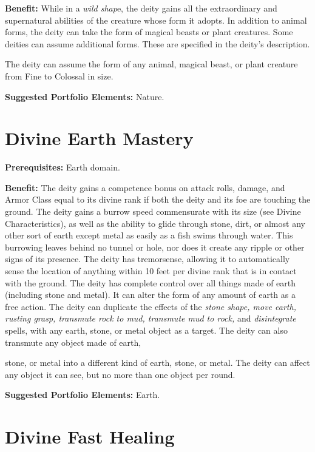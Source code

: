 \documentclass{article}
\begin{document}
\textbf{Benefit:} While in a \textit{wild shap}e, the deity gains all the extraordinary 
and supernatural abilities of the creature whose form it adopts. In addition to 
animal forms, the deity can take the form of magical beasts or plant creatures. 
Some deities can assume additional forms. These are specified in the deity's description.

The deity can assume the form of any animal, magical beast, or plant creature from 
Fine to Colossal in size.

\textbf{Suggested Portfolio Elements:} Nature.

\vspace{12pt}
\section*{Divine Earth Mastery}

\textbf{Prerequisites:} Earth domain.

\textbf{Benefit:} The deity gains a competence bonus on attack rolls, damage, and 
Armor Class equal to its divine rank if both the deity and its foe are touching 
the ground. The deity gains a burrow speed commensurate with its size (see Divine 
Characteristics), as well as the ability to glide through stone, dirt, or almost 
any other sort of earth except metal as easily as a fish swims through water. This 
burrowing leaves behind no tunnel or hole, nor does it create any ripple or other 
signs of its presence. The deity has tremorsense, allowing it to automatically 
sense the location of anything within 10 feet per divine rank that is in contact 
with the ground. The deity has complete control over all things made of earth (including 
stone and metal). It can alter the form of any amount of earth as a free action. 
The deity can duplicate the effects of the \textit{stone shape, move earth, rusting 
grasp, transmute rock to mud, transmute mud to rock, }and \textit{disintegrate 
}spells, with any earth, stone, or metal object as a target. The deity can also 
transmute any object made of earth,

stone, or metal into a different kind of earth, stone, or metal. The deity can 
affect any object it can see, but no more than one object per round.

\textbf{Suggested Portfolio Elements:} Earth.

\vspace{12pt}
\section*{Divine Fast Healing}
\end{document}
